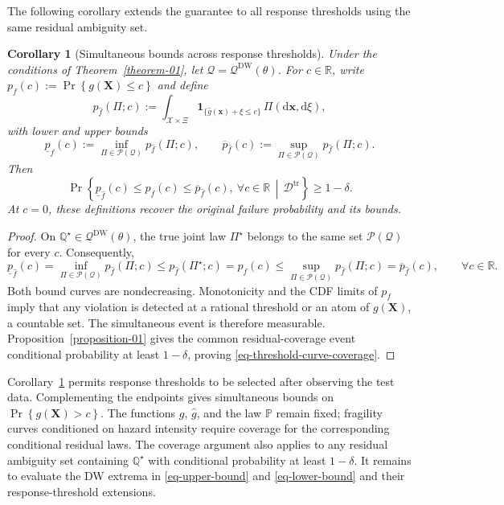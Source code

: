 \documentclass[review,11pt,3p,authoryear,nopreprintline]{elsarticle}
\newtheorem{corollary}{Corollary}
\begin{document}
The following corollary extends the guarantee to all response thresholds using the same residual ambiguity set.

\begin{corollary}[Simultaneous bounds across response thresholds]
  \label{cor-simultaneous-threshold-bounds}
  Under the conditions of Theorem~\ref{theorem-01}, let $\mathcal Q=\mathcal Q^{\mathrm{DW}}(\theta)$. For $c\in\mathbb R$, write $p_f(c):=\Pr \left\{g(\bm X)\le c\right\}$ and define
  \[
    p_{\hat f}(\Pi;c):=\int_{\mathcal X\times\Xi}
      \mathbf1_{\{\hat g(\bm x)+\xi\le c\}}\,\Pi(\mathrm d\bm x,\mathrm d\xi),
  \]
  with lower and upper bounds
  \[
    \underline p_{\hat f}(c):=\inf_{\Pi\in\mathcal P(\mathcal Q)}p_{\hat f}(\Pi;c),
    \qquad
    \overline p_{\hat f}(c):=\sup_{\Pi\in\mathcal P(\mathcal Q)}p_{\hat f}(\Pi;c).
  \]
  Then
  \begin{equation}
    \Pr\left\{\underline p_{\hat f}(c)\le p_f(c)\le\overline p_{\hat f}(c),
      \ \forall c\in\mathbb R\,\middle|\,\mathcal D^{\mathrm{tr}}\right\}\ge1-\delta.
    \label{eq-threshold-curve-coverage}
  \end{equation}
  At $c=0$, these definitions recover the original failure probability and its bounds.
\end{corollary}
\begin{proof}
  On $\mathbb Q^\star\in\mathcal Q^{\mathrm{DW}}(\theta)$, the true joint law $\Pi^\star$ belongs to the same set $\mathcal P(\mathcal Q)$ for every $c$. Consequently,
  \[ 
    \underline p_{\hat f}(c) =\inf_{\Pi\in\mathcal P(\mathcal Q)} p_{\hat f}(\Pi;c) \le p_{\hat f}(\Pi^\star;c) =p_f(c) \le\sup_{\Pi\in\mathcal P(\mathcal Q)} p_{\hat f}(\Pi;c) =\overline p_{\hat f}(c), \qquad\forall c\in\mathbb R.
  \]
  Both bound curves are nondecreasing. Monotonicity and the CDF limits of $p_f$ imply that any violation is detected at a rational threshold or an atom of $g(\bm X)$, a countable set. The simultaneous event is therefore measurable. Proposition~\ref{proposition-01} gives the common residual-coverage event conditional probability at least $1-\delta$, proving \eqref{eq-threshold-curve-coverage}.
\end{proof}

Corollary~\ref{cor-simultaneous-threshold-bounds} permits response thresholds to be selected after observing the test data. Complementing the endpoints gives simultaneous bounds on $\Pr \left\{g(\bm X)>c\right\}$. The functions $g$, $\hat g$, and the law $\mathbb P$ remain fixed; fragility curves conditioned on hazard intensity require coverage for the corresponding conditional residual laws. The coverage argument also applies to any residual ambiguity set containing $\mathbb Q^\star$ with conditional probability at least $1-\delta$. It remains to evaluate the DW extrema in \eqref{eq-upper-bound} and \eqref{eq-lower-bound} and their response-threshold extensions.
\end{document}
